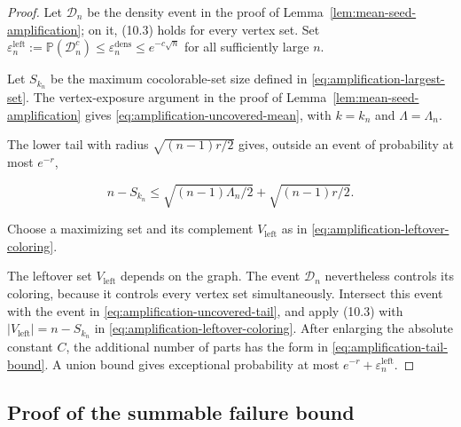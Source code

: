 \documentclass[a4paper,10pt,reqno]{amsart}
\numberwithin{equation}{section}
\theoremstyle{plain}
\theoremstyle{remark}
\begin{document}
\begin{proof}
Let $\mathcal D_n$ be the density event in the proof of
Lemma~\ref{lem:mean-seed-amplification}; on it, (10.3) holds for every
vertex set. Set $\varepsilon_n^{\mathrm{left}}:=\mathbb P(\mathcal D_n^c)
\le\varepsilon_n^{\mathrm{dens}}\le e^{-c\sqrt n}$ for all sufficiently
large $n$.

Let \(S_{k_n}\) be the maximum cocolorable-set size defined in
\eqref{eq:amplification-largest-set}. The vertex-exposure argument in the
proof of Lemma~\ref{lem:mean-seed-amplification} gives
\eqref{eq:amplification-uncovered-mean}, with \(k=k_n\) and
\(\Lambda=\Lambda_n\).

The lower tail with radius \(\sqrt{(n-1)r/2}\) gives, outside an event of
probability at most \(e^{-r}\),

\begin{equation}
 n-S_{k_n}\le
 \sqrt{(n-1)\Lambda_n/2}+\sqrt{(n-1)r/2}.                \label{eq:amplification-uncovered-tail}
\end{equation}

Choose a maximizing set and its complement \(V_{\mathrm{left}}\) as in
\eqref{eq:amplification-leftover-coloring}.

The leftover set $V_{\mathrm{left}}$ depends on the graph. The event
$\mathcal D_n$ nevertheless controls its coloring, because it controls every
vertex set simultaneously. Intersect this event with the event in
\eqref{eq:amplification-uncovered-tail}, and apply (10.3) with
$|V_{\mathrm{left}}|=n-S_{k_n}$ in
\eqref{eq:amplification-leftover-coloring}. After enlarging the absolute
constant $C$, the additional number of parts has the form in
\eqref{eq:amplification-tail-bound}. A union bound gives exceptional
probability at most $e^{-r}+\varepsilon_n^{\mathrm{left}}$.
\end{proof}

\subsection{Proof of the summable failure bound}
\label{app:failure-probability-proof}
\end{document}

